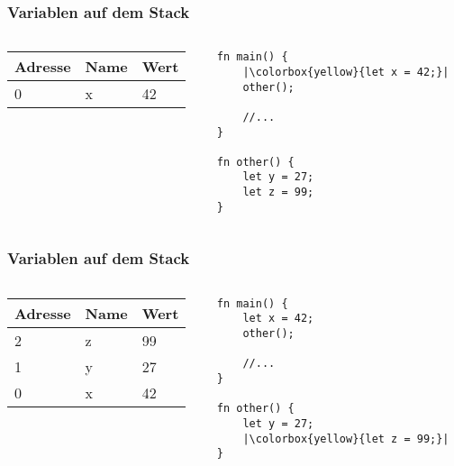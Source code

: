 \documentclass{beamer}
\begin{document}
\begin{frame}[fragile]
	\frametitle{Variablen auf dem Stack}
	\begin{columns}[T, c]
		\begin{column}{0.48\textwidth}
			\begin{tabular}{| l | l | l |}
				\hline
				Adresse & Name & Wert\\ \hline
				0 & x & 42 \\ \hline
			\end{tabular}
		\end{column}
		\begin{column}{0.48\textwidth}
			\begin{verbatim}
fn main() {
	|\colorbox{yellow}{let x = 42;}|
    other();

	//...
}

fn other() {
	let y = 27;
	let z = 99;
}
			\end{verbatim}
		\end{column}
	\end{columns}
\end{frame}
\begin{frame}[fragile]
	\frametitle{Variablen auf dem Stack}
	\begin{columns}[T, c]
		\begin{column}{0.48\textwidth}
			\begin{tabular}{| l | l | l |}
				\hline
				Adresse & Name & Wert \\ \hline
				2 & z & 99 \\ \hline
				1 & y & 27 \\ \hline
				0 & x & 42 \\ \hline
			\end{tabular}
		\end{column}
		\begin{column}{0.48\textwidth}
			\begin{verbatim}
fn main() {
	let x = 42;
	other();

	//...
}

fn other() {
	let y = 27;
	|\colorbox{yellow}{let z = 99;}|
}
			\end{verbatim}
		\end{column}
	\end{columns}
\end{frame}
\end{document}
